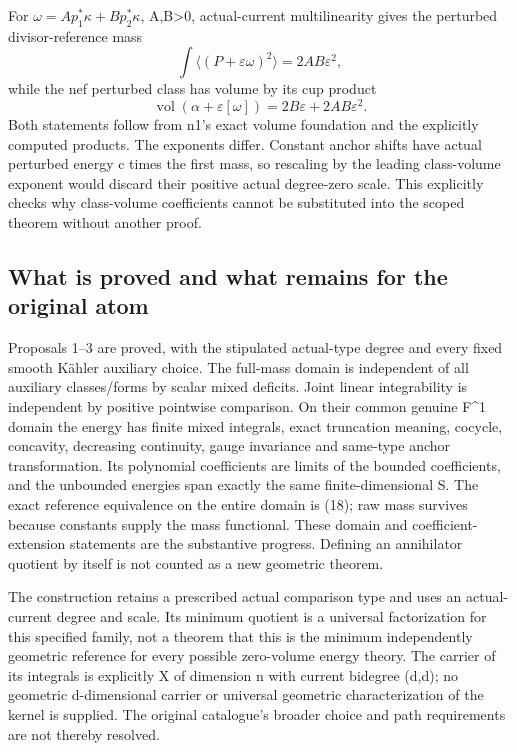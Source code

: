 \documentclass[
]{article}
\begin{document}
For \(\omega=A p_1^*\kappa+B p_2^*\kappa\), A,B\textgreater0,
actual-current multilinearity gives the perturbed divisor-reference mass
\[
\int\langle(P+\varepsilon\omega)^2\rangle
=2AB\varepsilon^2,
\] while the nef perturbed class has volume by its cup product \[
\operatorname{vol}(\alpha+\varepsilon[\omega])
=2B\varepsilon+2AB\varepsilon^2.
\] Both statements follow from n1's exact volume foundation and the
explicitly computed products. The exponents differ. Constant anchor
shifts have actual perturbed energy c times the first mass, so rescaling
by the leading class-volume exponent would discard their positive actual
degree-zero scale. This explicitly checks why class-volume coefficients
cannot be substituted into the scoped theorem without another proof.

\subsection{What is proved and what remains for the original
atom}\label{what-is-proved-and-what-remains-for-the-original-atom}

Proposals 1--3 are proved, with the stipulated actual-type degree and
every fixed smooth Kähler auxiliary choice. The full-mass domain is
independent of all auxiliary classes/forms by scalar mixed deficits.
Joint linear integrability is independent by positive pointwise
comparison. On their common genuine F\^{}1 domain the energy has finite
mixed integrals, exact truncation meaning, cocycle, concavity,
decreasing continuity, gauge invariance and same-type anchor
transformation. Its polynomial coefficients are limits of the bounded
coefficients, and the unbounded energies span exactly the same
finite-dimensional S. The exact reference equivalence on the entire
domain is (18); raw mass survives because constants supply the mass
functional. These domain and coefficient-extension statements are the
substantive progress. Defining an annihilator quotient by itself is not
counted as a new geometric theorem.

The construction retains a prescribed actual comparison type and uses an
actual-current degree and scale. Its minimum quotient is a universal
factorization for this specified family, not a theorem that this is the
minimum independently geometric reference for every possible zero-volume
energy theory. The carrier of its integrals is explicitly X of dimension
n with current bidegree (d,d); no geometric d-dimensional carrier or
universal geometric characterization of the kernel is supplied. The
original catalogue's broader choice and path requirements are not
thereby resolved.
\end{document}
